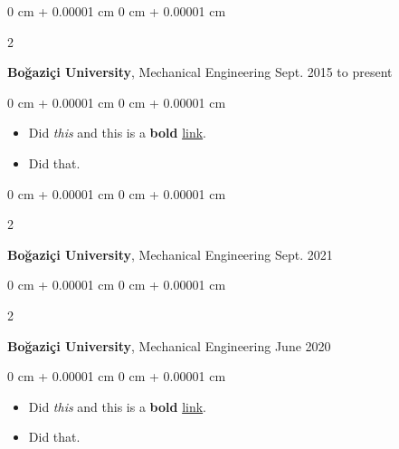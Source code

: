 \documentclass[10pt, letterpaper]{article}
\newenvironment{highlights}{
    \begin{itemize}[
        topsep=0.10 cm,
        parsep=0.10 cm,
        partopsep=0pt,
        itemsep=0pt,
        leftmargin=0 cm + 10pt
    ]
}{
    \end{itemize}
        
    \vspace{-0.10cm}
} %
\newenvironment{onecolentry}{
    \begin{adjustwidth}{
        0 cm + 0.00001 cm
    }{
        0 cm + 0.00001 cm
    }
}{
    \end{adjustwidth}
} %
\newenvironment{twocolentry}[2][]{
    \onecolentry
    \def\secondColumn{#2}
    \setcolumnwidth{\fill, 4.1 cm}
    \begin{paracol}{2}
}{
    \switchcolumn \raggedleft \secondColumn
    \end{paracol}
    \endonecolentry
} %
\begin{document}
        \vspace{0.10 cm}


        \vspace{0.15 cm}

        \begin{twocolentry}{
            Sept. 2015 to present
        }
            \textbf{Boğaziçi University}, Mechanical Engineering\end{twocolentry}

        \vspace{0.10 cm}
        \begin{onecolentry}
            \begin{highlights}
                \item Did \textit{this} and this is a \textbf{bold} \href{https://example.com}{link}.
                \item Did that.
            \end{highlights}
        \end{onecolentry}


        \vspace{0.15 cm}

        \begin{twocolentry}{
            Sept. 2021
        }
            \textbf{Boğaziçi University}, Mechanical Engineering\end{twocolentry}

        \vspace{0.10 cm}


        \vspace{0.15 cm}

        \begin{twocolentry}{
            June 2020
        }
            \textbf{Boğaziçi University}, Mechanical Engineering\end{twocolentry}

        \vspace{0.10 cm}
        \begin{onecolentry}
            \begin{highlights}
                \item Did \textit{this} and this is a \textbf{bold} \href{https://example.com}{link}.
                \item Did that.
            \end{highlights}
        \end{onecolentry}


        \vspace{0.15 cm}
\end{document}
